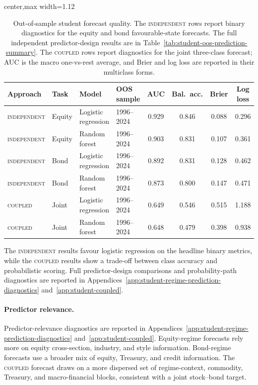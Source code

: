 \documentclass[10pt]{article}
\renewcommand{\arraystretch}{1.0}
\newcommand{\Acoup}{\textsc{coupled}}
\newcommand{\Bindep}{\textsc{independent}}
\begin{document}
\begin{table}[H]
    \centering
    \caption{Out-of-sample student forecast quality. The \Bindep{} rows report binary
        diagnostics for the equity and bond favourable-state forecasts. The full independent
        predictor-design results are in Table~\ref{tab:student-oos-prediction-summary}. The
        \Acoup{} rows report diagnostics for the joint three-class forecast; AUC is the macro
        one-vs-rest average, and Brier and log loss are reported in their multiclass forms.}
    \label{tab:forecast}
    \footnotesize
    \setlength{\tabcolsep}{5.0pt}
    \renewcommand{\arraystretch}{1.03}
    \begin{adjustbox}{center,max width=1.12\textwidth}
        \begin{tabular}{@{}llllcccc@{}}
            \toprule
            Approach  & Task   & Model               & OOS sample & AUC   & Bal.\ acc. & Brier & Log loss \\
            \midrule
            \Bindep{} & Equity & Logistic regression & 1996--2024 & 0.929 & 0.846      & 0.088 & 0.296    \\
            \Bindep{} & Equity & Random forest       & 1996--2024 & 0.903 & 0.831      & 0.107 & 0.361    \\
            \Bindep{} & Bond   & Logistic regression & 1996--2024 & 0.892 & 0.831      & 0.128 & 0.462    \\
            \Bindep{} & Bond   & Random forest       & 1996--2024 & 0.873 & 0.800      & 0.147 & 0.471    \\
            \midrule
            \Acoup{}  & Joint  & Logistic regression & 1996--2024 & 0.649 & 0.546      & 0.515 & 1.188    \\
            \Acoup{}  & Joint  & Random forest       & 1996--2024 & 0.648 & 0.479      & 0.398 & 0.938    \\
            \bottomrule
        \end{tabular}
    \end{adjustbox}
\end{table}

The \Bindep{} results favour logistic regression on the headline binary metrics, while the
\Acoup{} results show a trade-off between class accuracy and probabilistic scoring. Full
predictor-design comparisons and probability-path diagnostics are reported in
Appendices~\ref{app:student-regime-prediction-diagnostics} and~\ref{app:student-coupled}.

\paragraph{Predictor relevance.}
Predictor-relevance diagnostics are reported in Appendices~\ref{app:student-regime-prediction-diagnostics}
and~\ref{app:student-coupled}. Equity-regime forecasts rely more on equity cross-section,
industry, and style information. Bond-regime forecasts use a broader mix of equity,
Treasury, and credit information. The \Acoup{} forecast draws on a more dispersed set of
regime-context, commodity, Treasury, and macro-financial blocks, consistent with a joint
stock--bond target.
\end{document}
